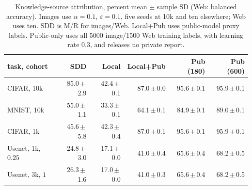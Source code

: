 \begin{table}[t]
\centering
\caption{Knowledge-source attribution, percent mean $\pm$ sample SD (Web: balanced accuracy). Images use $\alpha=0.1$, $\varepsilon=0.1$, five seeds at 10k and ten elsewhere; Web uses ten. SDD is M/R for images/Web. Local+Pub uses public-model proxy labels. Public-only uses all 5000 image/1500 Web training labels, with learning rate 0.3, and releases no private report.}
\label{tab:attribution}
\small\setlength{\tabcolsep}{3pt}
\begin{tabular}{@{}lrrrrr@{}}\toprule
task, cohort & SDD & Local & Local+Pub & Pub (180) & Pub (600) \\\midrule
CIFAR, 10k & 85.0\,$\pm$\,2.9 & 42.4\,$\pm$\,0.1 & 87.0\,$\pm$\,0.0 & 95.6\,$\pm$\,0.1 & 95.9\,$\pm$\,0.1 \\
MNIST, 10k & 55.0\,$\pm$\,1.1 & 33.3\,$\pm$\,0.1 & 64.1\,$\pm$\,0.1 & 84.9\,$\pm$\,0.1 & 89.0\,$\pm$\,0.1 \\
CIFAR, 1k & 45.6\,$\pm$\,5.8 & 42.3\,$\pm$\,0.4 & 87.0\,$\pm$\,0.1 & 95.6\,$\pm$\,0.1 & 95.9\,$\pm$\,0.1 \\
Usenet, 1k, $0.25$ & 24.8\,$\pm$\,3.0 & 17.1\,$\pm$\,0.0 & 41.0\,$\pm$\,0.4 & 65.6\,$\pm$\,0.4 & 68.2\,$\pm$\,0.5 \\
Usenet, 3k, $1$ & 26.3\,$\pm$\,1.6 & 17.0\,$\pm$\,0.0 & 41.0\,$\pm$\,0.3 & 65.6\,$\pm$\,0.4 & 68.2\,$\pm$\,0.5 \\
\bottomrule\end{tabular}
\end{table}

